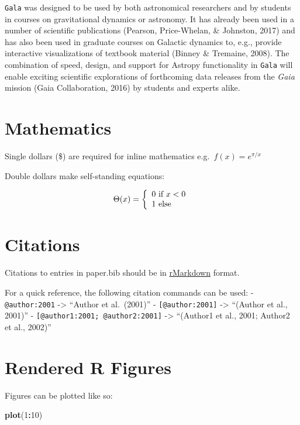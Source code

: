 \documentclass[10pt,a4paper,onecolumn]{article}
\newenvironment{Shaded}{\begin{snugshade}}{\end{snugshade}}
\newcommand{\DecValTok}[1]{\textcolor[rgb]{0.00,0.00,0.81}{#1}}
\newcommand{\FunctionTok}[1]{\textcolor[rgb]{0.13,0.29,0.53}{\textbf{#1}}}
\newcommand{\NormalTok}[1]{#1}
\newcommand{\SpecialCharTok}[1]{\textcolor[rgb]{0.81,0.36,0.00}{\textbf{#1}}}
\begin{document}
\texttt{Gala} was designed to be used by both astronomical researchers
and by students in courses on gravitational dynamics or astronomy. It
has already been used in a number of scientific publications (Pearson,
Price-Whelan, \& Johnston, 2017) and has also been used in graduate
courses on Galactic dynamics to, e.g., provide interactive
visualizations of textbook material (Binney \& Tremaine, 2008). The
combination of speed, design, and support for Astropy functionality in
\texttt{Gala} will enable exciting scientific explorations of
forthcoming data releases from the \emph{Gaia} mission (Gaia
Collaboration, 2016) by students and experts alike.

\section{Mathematics}\label{mathematics}

Single dollars (\$) are required for inline mathematics
e.g.~\(f(x) = e^{\pi/x}\)

Double dollars make self-standing equations:

\[\Theta(x) = \left\{\begin{array}{l}
0\textrm{ if } x < 0\cr
1\textrm{ else}
\end{array}\right.\]

\section{Citations}\label{citations}

Citations to entries in paper.bib should be in
\href{https://rmarkdown.rstudio.com/authoring_bibliographies_and_citations.html}{rMarkdown}
format.

For a quick reference, the following citation commands can be used: -
\texttt{@author:2001} -\textgreater{} ``Author et al.~(2001)'' -
\texttt{{[}@author:2001{]}} -\textgreater{} ``(Author et al., 2001)'' -
\texttt{{[}@author1:2001;\ @author2:2001{]}} -\textgreater{} ``(Author1
et al., 2001; Author2 et al., 2002)''

\section{Rendered R Figures}\label{rendered-r-figures}

Figures can be plotted like so:

\begin{Shaded}
\begin{Highlighting}[]
\FunctionTok{plot}\NormalTok{(}\DecValTok{1}\SpecialCharTok{:}\DecValTok{10}\NormalTok{)}
\end{Highlighting}
\end{Shaded}
\end{document}

